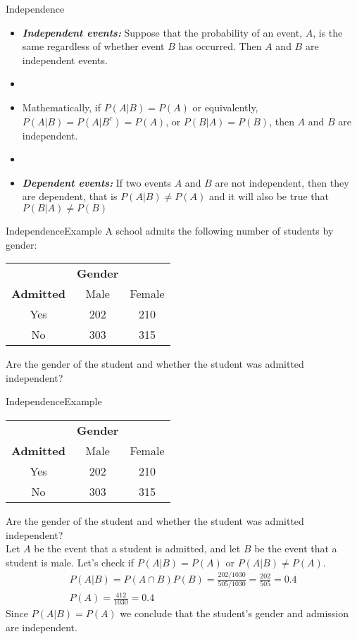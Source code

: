 \documentclass[xcolor=dvipsnames]{beamer}
\begin{document}
\begin{frame}{Independence}
	\begin{itemize}
		\item \textbf{\emph{Independent events:}} Suppose that the probability of an event, $A$, is the same regardless of whether event $B$ has occurred. Then $A$ and $B$ are independent events. \pause
		\item[]
		\item Mathematically, if $P(A|B) = P(A)$ or equivalently, $P(A|B) = P(A|B^c) = P(A)$, or $P(B|A) = P(B)$, then $A$ and $B$ are independent.\pause
		\item[]
		\item \textbf{\emph{Dependent events:}} If two events $A$ and $B$ are not independent, then they are dependent, that is $P(A|B) \neq P(A)$ and it will also be true that $P(B|A) \neq P(B)$
	\end{itemize}
\end{frame}

\begin{frame}{Independence}{Example}
A school admits the following number of students by gender:
\begin{center}
		\begin{tabular}{c|cc}
		& \textbf{Gender} & \\
		\textbf{Admitted} & Male & Female \\ \hline
		Yes & 202 & 210 \\
		No & 303 & 315
	\end{tabular}
\end{center}
Are the gender of the student and whether the student was admitted independent?
\end{frame}

\begin{frame}{Independence}{Example}
\begin{center}
	\begin{tabular}{c|cc}
		& \textbf{Gender} & \\
		\textbf{Admitted} & Male & Female \\ \hline
		Yes & 202 & 210 \\
		No & 303 & 315
	\end{tabular}
\end{center}
Are the gender of the student and whether the student was admitted independent? \\ \pause 
Let $A$ be the event that a student is admitted, and let $B$ be the event that a student is male. Let's check if $P(A|B) = P(A)$ or $P(A|B) \neq P(A)$. \pause
\begin{gather*}
	P(A|B) = P(A \cap B) P(B) = \frac{202/1030}{505/1030}= \frac{202}{505} = 0.4 \\
	P(A) = \frac{412}{1030} = 0.4
\end{gather*}\pause
Since $P(A|B) = P(A)$ we conclude that the student's gender and admission are independent. 
\end{frame}
\end{document}
